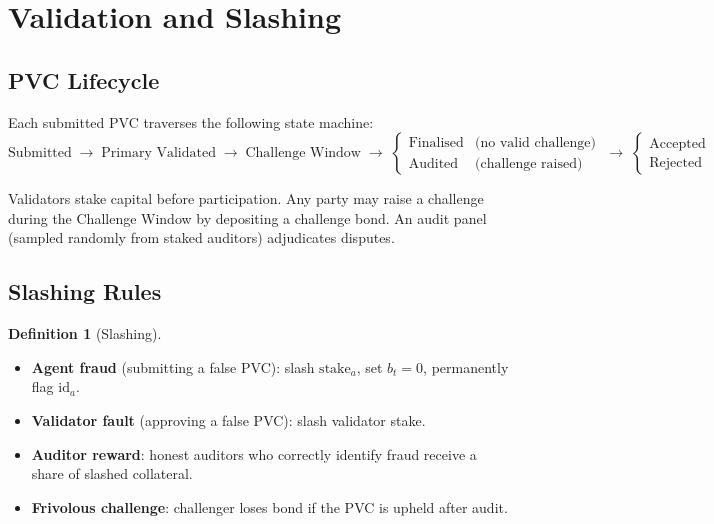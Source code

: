 \documentclass[11pt,a4paper]{article}
\theoremstyle{plain}
\theoremstyle{definition}
\newtheorem{definition}[theorem]{Definition}
\theoremstyle{remark}
\begin{document}
\section{Validation and Slashing}

\subsection{PVC Lifecycle}

Each submitted PVC traverses the following state machine:
\[
  \text{Submitted}
  \;\to\;
  \text{Primary Validated}
  \;\to\;
  \text{Challenge Window}
  \;\to\;
  \begin{cases}
    \text{Finalised} & \text{(no valid challenge)} \\
    \text{Audited}   & \text{(challenge raised)}
  \end{cases}
  \;\to\;
  \begin{cases}
    \text{Accepted} \\
    \text{Rejected}
  \end{cases}
\]

Validators stake capital before participation. Any party may raise a challenge
during the Challenge Window by depositing a challenge bond. An audit panel
(sampled randomly from staked auditors) adjudicates disputes.

\subsection{Slashing Rules}

\begin{definition}[Slashing]
\begin{itemize}
  \item \textbf{Agent fraud} (submitting a false PVC): slash $\mathrm{stake}_a$,
        set $b_t = 0$, permanently flag $\mathrm{id}_a$.
  \item \textbf{Validator fault} (approving a false PVC): slash validator stake.
  \item \textbf{Auditor reward}: honest auditors who correctly identify fraud
        receive a share of slashed collateral.
  \item \textbf{Frivolous challenge}: challenger loses bond if the PVC is
        upheld after audit.
\end{itemize}
\end{definition}
\end{document}
